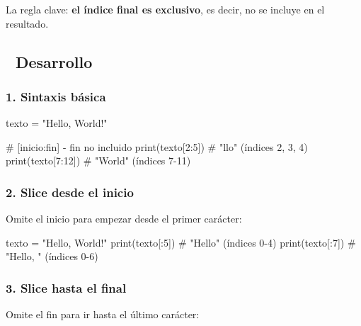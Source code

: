 \documentclass[
  doc,
  floatsintext,
  longtable,
  a4paper,
  nolmodern,
  notxfonts,
  notimes,
  12pt,
  colorlinks=true,linkcolor=blue,citecolor=blue,urlcolor=blue]{apa7}
\newenvironment{Shaded}{\begin{snugshade}}{\end{snugshade}}
\newcommand{\BuiltInTok}[1]{\textcolor[rgb]{0.00,0.23,0.31}{#1}}
\newcommand{\CommentTok}[1]{\textcolor[rgb]{0.37,0.37,0.37}{#1}}
\newcommand{\DecValTok}[1]{\textcolor[rgb]{0.68,0.00,0.00}{#1}}
\newcommand{\NormalTok}[1]{\textcolor[rgb]{0.00,0.23,0.31}{#1}}
\newcommand{\OperatorTok}[1]{\textcolor[rgb]{0.37,0.37,0.37}{#1}}
\newcommand{\StringTok}[1]{\textcolor[rgb]{0.13,0.47,0.30}{#1}}
\begin{document}
La regla clave: \textbf{el índice final es exclusivo}, es decir, no se
incluye en el resultado.

\subsection{📐 Desarrollo}\label{desarrollo}

\subsubsection{1. Sintaxis básica}\label{sintaxis-buxe1sica}

\begin{Shaded}
\begin{Highlighting}[]
\NormalTok{texto }\OperatorTok{=} \StringTok{"Hello, World!"}

\CommentTok{\# [inicio:fin] {-} fin no incluido}
\BuiltInTok{print}\NormalTok{(texto[}\DecValTok{2}\NormalTok{:}\DecValTok{5}\NormalTok{])   }\CommentTok{\# "llo" (índices 2, 3, 4)}
\BuiltInTok{print}\NormalTok{(texto[}\DecValTok{7}\NormalTok{:}\DecValTok{12}\NormalTok{])  }\CommentTok{\# "World" (índices 7{-}11)}
\end{Highlighting}
\end{Shaded}

\subsubsection{2. Slice desde el inicio}\label{slice-desde-el-inicio}

Omite el inicio para empezar desde el primer carácter:

\begin{Shaded}
\begin{Highlighting}[]
\NormalTok{texto }\OperatorTok{=} \StringTok{"Hello, World!"}
\BuiltInTok{print}\NormalTok{(texto[:}\DecValTok{5}\NormalTok{])   }\CommentTok{\# "Hello" (índices 0{-}4)}
\BuiltInTok{print}\NormalTok{(texto[:}\DecValTok{7}\NormalTok{])   }\CommentTok{\# "Hello, " (índices 0{-}6)}
\end{Highlighting}
\end{Shaded}

\subsubsection{3. Slice hasta el final}\label{slice-hasta-el-final}

Omite el fin para ir hasta el último carácter:
\end{document}
